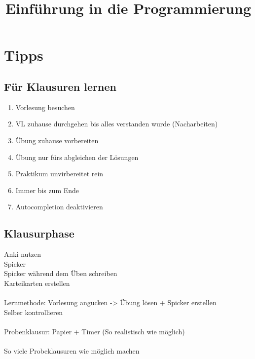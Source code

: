 \documentclass[11pt, a4paper]{article}
\begin{document}
\title{Einführung in die Programmierung}
\maketitle

\thispagestyle{empty}


\newpage

\tableofcontents

\newpage

\section{Tipps}

\subsection{Für Klausuren lernen}
\begin{enumerate}
\item Vorlesung besuchen
\item VL zuhause durchgehen bis alles verstanden wurde (Nacharbeiten)
\item Übung zuhause vorbereiten
\item Übung nur fürs abgleichen der Lösungen
\item Praktikum unvirbereitet rein
\item Immer bis zum Ende
\item Autocompletion deaktivieren
\end{enumerate}

\subsection{Klausurphase}
Anki nutzen\\Spicker\\Spicker während dem Üben schreiben\\Karteikarten erstellen\\
\\Lernmethode: Vorlesung angucken -> Übung lösen + Spicker erstellen\\Selber kontrollieren\\
\\Probenklausur: Papier + Timer (So realistisch wie möglich)\\
\\So viele Probeklausuren wie möglich machen
\end{document}
